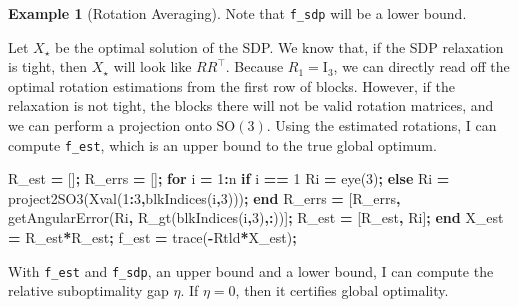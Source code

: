 \documentclass[
]{book}
\newenvironment{Shaded}{\begin{snugshade}}{\end{snugshade}}
\newcommand{\FloatTok}[1]{\textcolor[rgb]{0.00,0.00,0.81}{#1}}
\newcommand{\KeywordTok}[1]{\textcolor[rgb]{0.13,0.29,0.53}{\textbf{#1}}}
\newcommand{\NormalTok}[1]{#1}
\newcommand{\OperatorTok}[1]{\textcolor[rgb]{0.81,0.36,0.00}{\textbf{#1}}}
\newcommand{\VariableTok}[1]{\textcolor[rgb]{0.00,0.00,0.00}{#1}}
\theoremstyle{definition}
\theoremstyle{definition}
\newtheorem{example}{Example}[chapter]
\theoremstyle{definition}
\theoremstyle{definition}
\theoremstyle{remark}
\begin{document}
\begin{example}[Rotation Averaging]
Note that \texttt{f\_sdp} will be a lower bound.

Let \(X_\star\) be the optimal solution of the SDP. We know that, if the SDP relaxation is tight, then \(X_\star\) will look like \(RR^\top\). Because \(R_1 = \mathrm{I}_3\), we can directly read off the optimal rotation estimations from the first row of blocks. However, if the relaxation is not tight, the blocks there will not be valid rotation matrices, and we can perform a projection onto \(\mathrm{SO}(3)\). Using the estimated rotations, I can compute \texttt{f\_est}, which is an upper bound to the true global optimum.

\begin{Shaded}
\begin{Highlighting}[]
\VariableTok{R\_est} \OperatorTok{=}\NormalTok{ []}\OperatorTok{;}
\VariableTok{R\_errs} \OperatorTok{=}\NormalTok{ []}\OperatorTok{;}
\KeywordTok{for} \VariableTok{i} \OperatorTok{=} \FloatTok{1}\OperatorTok{:}\VariableTok{n}
    \KeywordTok{if} \VariableTok{i} \OperatorTok{==} \FloatTok{1}
        \VariableTok{Ri} \OperatorTok{=} \VariableTok{eye}\NormalTok{(}\FloatTok{3}\NormalTok{)}\OperatorTok{;}
    \KeywordTok{else}
        \VariableTok{Ri} \OperatorTok{=} \VariableTok{project2SO3}\NormalTok{(}\VariableTok{Xval}\NormalTok{(}\FloatTok{1}\OperatorTok{:}\FloatTok{3}\OperatorTok{,}\VariableTok{blkIndices}\NormalTok{(}\VariableTok{i}\OperatorTok{,}\FloatTok{3}\NormalTok{)))}\OperatorTok{;}
    \KeywordTok{end}
    \VariableTok{R\_errs} \OperatorTok{=}\NormalTok{ [}\VariableTok{R\_errs}\OperatorTok{,} \VariableTok{getAngularError}\NormalTok{(}\VariableTok{Ri}\OperatorTok{,} \VariableTok{R\_gt}\NormalTok{(}\VariableTok{blkIndices}\NormalTok{(}\VariableTok{i}\OperatorTok{,}\FloatTok{3}\NormalTok{)}\OperatorTok{,:}\NormalTok{))]}\OperatorTok{;}
    \VariableTok{R\_est} \OperatorTok{=}\NormalTok{ [}\VariableTok{R\_est}\OperatorTok{,} \VariableTok{Ri}\NormalTok{]}\OperatorTok{;}
\KeywordTok{end}
\VariableTok{X\_est} \OperatorTok{=} \VariableTok{R\_est}\OperatorTok{\textquotesingle{}*}\VariableTok{R\_est}\OperatorTok{;}
\VariableTok{f\_est} \OperatorTok{=} \VariableTok{trace}\NormalTok{(}\OperatorTok{{-}}\VariableTok{Rtld}\OperatorTok{*}\VariableTok{X\_est}\NormalTok{)}\OperatorTok{;}
\end{Highlighting}
\end{Shaded}

With \texttt{f\_est} and \texttt{f\_sdp}, an upper bound and a lower bound, I can compute the relative suboptimality gap \(\eta\). If \(\eta = 0\), then it certifies global optimality.


\end{example}
\end{document}
